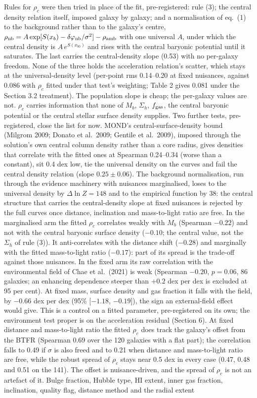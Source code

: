 \documentclass[
  10pt,
]{article}
\begin{document}
Rules for $\rho_c$ were then tried in place of the fit, pre-registered: rule (3); the central density relation itself, imposed galaxy by galaxy; and a normalisation of eq.~(1) to the background rather than to the galaxy's centre, $\rho_{\rm nb}=A\exp[S(x_b)-\delta\varphi_{\rm nb}/\sigma^2]-\rho_{\rm amb}$ with one universal $A$, under which the central density is $A\,e^{S(x_{b0})}$ and rises with the central baryonic potential until it saturates. The last carries the central-density slope (0.53) with no per-galaxy freedom. None of the three holds the acceleration relation's scatter, which stays at the universal-density level (per-point rms 0.14--0.20 at fixed nuisances, against 0.086 with $\rho_c$ fitted under that test's weighting; Table 2 gives 0.081 under the Section 3.2 treatment). The population slope is cheap; the per-galaxy values are not. $\rho_c$ carries information that none of $M_b$, $\Sigma_h$, $f_{\rm gas}$, the central baryonic potential or the central stellar surface density supplies. Two further tests, pre-registered, close the list for now. MOND's central-surface-density bound (Milgrom 2009; Donato et al.~2009; Gentile et al.~2009), imposed through the solution's own central column density rather than a core radius, gives densities that correlate with the fitted ones at Spearman 0.24--0.34 (worse than a constant), sit 0.4 dex low, tie the universal density on the curves and fail the central density relation (slope $0.25\pm0.06$). The background normalisation, run through the evidence machinery with nuisances marginalised, loses to the universal density by $\Delta\ln Z=148$ and to the empirical function by 38: the central structure that carries the central-density slope at fixed nuisances is rejected by the full curves once distance, inclination and mass-to-light ratio are free. In the marginalised arm the fitted $\rho_c$ correlates weakly with $M_b$ (Spearman $-0.22$) and not with the central baryonic surface density ($-0.10$; the central value, not the $\Sigma_h$ of rule (3)). It anti-correlates with the distance shift ($-0.28$) and marginally with the fitted mass-to-light ratio ($-0.17$): part of its spread is the trade-off against those nuisances. In the fixed arm its raw correlation with the environmental field of Chae et al.~(2021) is weak (Spearman $-0.20$, $p=0.06$, 86 galaxies; an enhancing dependence steeper than $+0.2$ dex per dex is excluded at 95 per cent). At fixed mass, surface density and gas fraction it falls with the field, by $-0.66$ dex per dex (95\% {[}$-1.18$, $-0.19${]}), the sign an external-field effect would give. This is a control on a fitted parameter, pre-registered on its own; the environment test proper is on the acceleration residual (Section 6). At fixed distance and mass-to-light ratio the fitted $\rho_c$ does track the galaxy's offset from the BTFR (Spearman 0.69 over the 120 galaxies with a flat part); the correlation falls to 0.49 if $\sigma$ is also freed and to 0.21 when distance and mass-to-light ratio are free, while the robust spread of $\rho_c$ stays near 0.5 dex in every case (0.47, 0.48 and 0.51 on the 141). The offset is nuisance-driven, and the spread of $\rho_c$ is not an artefact of it. Bulge fraction, Hubble type, HI extent, inner gas fraction, inclination, quality flag, distance method and the radial extent 
\end{document}
